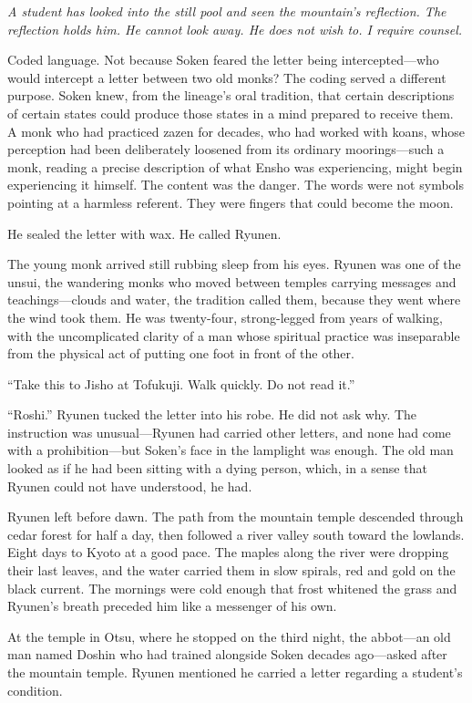 \emph{A student has looked into the still pool and seen the mountain's reflection. The reflection holds him. He cannot look away. He does not wish to. I require counsel.}

Coded language. Not because Soken feared the letter being intercepted---who would intercept a letter between two old monks? The coding served a different purpose. Soken knew, from the lineage's oral tradition, that certain descriptions of certain states could produce those states in a mind prepared to receive them. A monk who had practiced zazen for decades, who had worked with koans, whose perception had been deliberately loosened from its ordinary moorings---such a monk, reading a precise description of what Ensho was experiencing, might begin experiencing it himself. The content was the danger. The words were not symbols pointing at a harmless referent. They were fingers that could become the moon.

He sealed the letter with wax. He called Ryunen.

The young monk arrived still rubbing sleep from his eyes. Ryunen was one of the unsui, the wandering monks who moved between temples carrying messages and teachings---clouds and water, the tradition called them, because they went where the wind took them. He was twenty-four, strong-legged from years of walking, with the uncomplicated clarity of a man whose spiritual practice was inseparable from the physical act of putting one foot in front of the other.

``Take this to Jisho at Tofukuji. Walk quickly. Do not read it.''

``Roshi.'' Ryunen tucked the letter into his robe. He did not ask why. The instruction was unusual---Ryunen had carried other letters, and none had come with a prohibition---but Soken's face in the lamplight was enough. The old man looked as if he had been sitting with a dying person, which, in a sense that Ryunen could not have understood, he had.

Ryunen left before dawn. The path from the mountain temple descended through cedar forest for half a day, then followed a river valley south toward the lowlands. Eight days to Kyoto at a good pace. The maples along the river were dropping their last leaves, and the water carried them in slow spirals, red and gold on the black current. The mornings were cold enough that frost whitened the grass and Ryunen's breath preceded him like a messenger of his own.

At the temple in Otsu, where he stopped on the third night, the abbot---an old man named Doshin who had trained alongside Soken decades ago---asked after the mountain temple. Ryunen mentioned he carried a letter regarding a student's condition.

